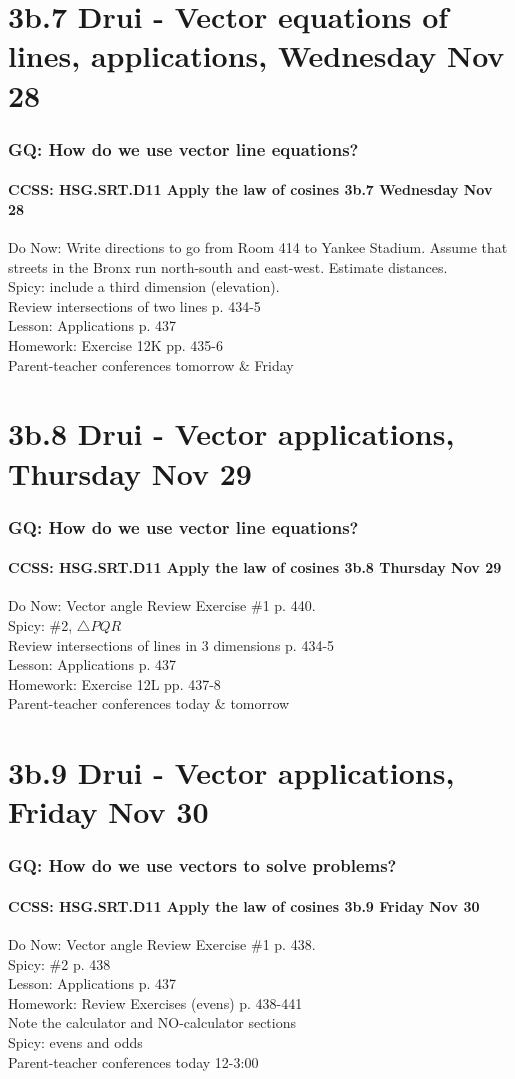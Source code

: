 \documentclass{beamer}
\begin{document}
  \section{3b.7 Drui - Vector equations of lines, applications, Wednesday Nov 28}
    \frame
    {
      \frametitle{GQ: How do we use vector line equations?}
      \framesubtitle{CCSS: HSG.SRT.D11 Apply the law of cosines \qquad \alert{3b.7 Wednesday Nov 28}}

        Do Now: Write directions to go from Room 414 to Yankee Stadium. Assume that streets in the Bronx run north-south and east-west. Estimate distances. \\[0.5cm]
        Spicy: include a third dimension (elevation).\\[1cm]

      Review intersections of two lines p. 434-5\\
      Lesson: Applications p. 437 \\
      Homework: Exercise 12K pp. 435-6\\[0.5cm]
      \alert{Parent-teacher conferences tomorrow \& Friday}
    }

  \section{3b.8 Drui - Vector applications, Thursday Nov 29}
    \frame
    {
      \frametitle{GQ: How do we use vector line equations?}
      \framesubtitle{CCSS: HSG.SRT.D11 Apply the law of cosines \qquad \alert{3b.8 Thursday Nov 29}}

        Do Now: Vector angle Review Exercise \#1 p. 440.\\
        Spicy: \#2, $\triangle PQR$ \\[1cm]

      Review intersections of lines in 3 dimensions p. 434-5\\
      Lesson: Applications p. 437 \\
      Homework: Exercise 12L pp. 437-8\\[0.5cm]
      \alert{Parent-teacher conferences today \& tomorrow}
    }

  \section{3b.9 Drui - Vector applications, Friday Nov 30}
    \frame
    {
      \frametitle{GQ: How do we use vectors to solve problems?}
      \framesubtitle{CCSS: HSG.SRT.D11 Apply the law of cosines \qquad \alert{3b.9 Friday Nov 30}}

        Do Now: Vector angle Review Exercise \#1 p. 438.\\
        Spicy: \#2 p. 438\\[1cm]

      Lesson: Applications p. 437 \\
      Homework: Review Exercises (evens) p. 438-441\\
      \alert{Note the calculator and NO-calculator sections}\\
      Spicy: evens and odds\\[0.5cm]
      \alert{Parent-teacher conferences today 12-3:00}
    }
\end{document}
